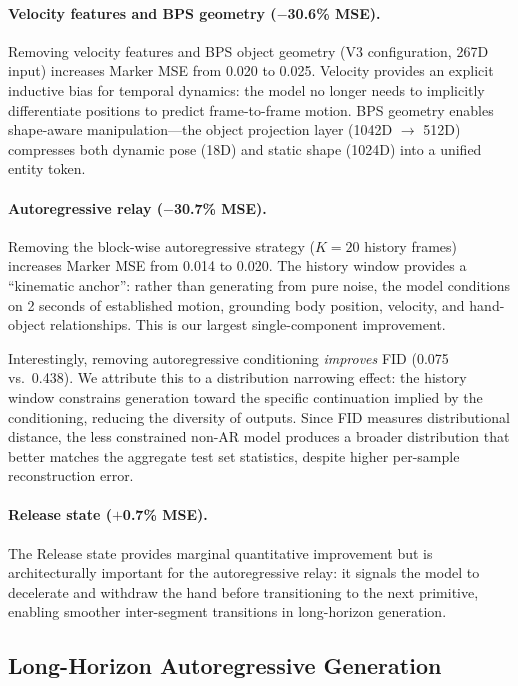 \paragraph{Velocity features and BPS geometry ($-$30.6\% MSE).}
Removing velocity features and BPS object geometry (V3 configuration, 267D input) increases Marker MSE from 0.020 to 0.025.
Velocity provides an explicit inductive bias for temporal dynamics: the model no longer needs to implicitly differentiate positions to predict frame-to-frame motion.
BPS geometry enables shape-aware manipulation---the object projection layer (1042D $\to$ 512D) compresses both dynamic pose (18D) and static shape (1024D) into a unified entity token.

\paragraph{Autoregressive relay ($-$30.7\% MSE).}
Removing the block-wise autoregressive strategy ($K{=}20$ history frames) increases Marker MSE from 0.014 to 0.020.
The history window provides a ``kinematic anchor'': rather than generating from pure noise, the model conditions on 2 seconds of established motion, grounding body position, velocity, and hand-object relationships.
This is our largest single-component improvement.

Interestingly, removing autoregressive conditioning \emph{improves} FID (0.075 vs.\ 0.438).
We attribute this to a distribution narrowing effect: the history window constrains generation toward the specific continuation implied by the conditioning, reducing the diversity of outputs.
Since FID measures distributional distance, the less constrained non-AR model produces a broader distribution that better matches the aggregate test set statistics, despite higher per-sample reconstruction error.

\paragraph{Release state ($+$0.7\% MSE).}
The Release state provides marginal quantitative improvement but is architecturally important for the autoregressive relay: it signals the model to decelerate and withdraw the hand before transitioning to the next primitive, enabling smoother inter-segment transitions in long-horizon generation.


\subsection{Long-Horizon Autoregressive Generation}
\label{sec:long_horizon}

